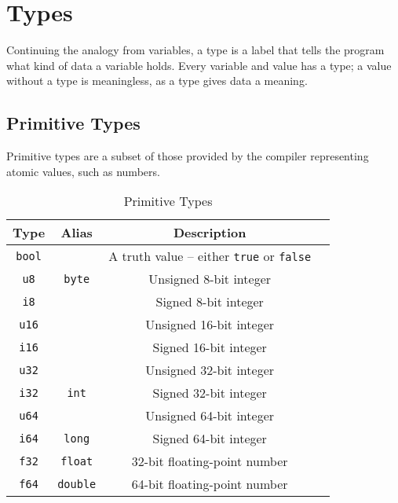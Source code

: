 \documentclass{article}
\begin{document}
    \section{Types}

    Continuing the analogy from variables, a type is a label that tells the program what kind of data a variable holds.
    Every variable and value has a type; a value without a type is meaningless, as a type gives data a meaning.

    \subsection{Primitive Types}

    Primitive types are a subset of those provided by the compiler representing atomic values, such as numbers.

    \medskip
    \begin{table}[H]
        \begin{tabular}{|c|c|c|l|}
            \hline
            \textbf{Type} & \textbf{Alias} & \textbf{Description} \\
            \hline
            \texttt{bool} & & A truth value -- either \texttt{true} or \texttt{false} \\
            \hline
            \texttt{u8} & \texttt{byte} & Unsigned 8-bit integer \\
            \texttt{i8} & & Signed 8-bit integer \\
            \hline
            \texttt{u16} & & Unsigned 16-bit integer \\
            \texttt{i16} & & Signed 16-bit integer \\
            \hline
            \texttt{u32} & & Unsigned 32-bit integer \\
            \texttt{i32} & \texttt{int} & Signed 32-bit integer \\
            \hline
            \texttt{u64} & & Unsigned 64-bit integer \\
            \texttt{i64} & \texttt{long} & Signed 64-bit integer \\
            \hline
            \texttt{f32} & \texttt{float} & 32-bit floating-point number \\
            \texttt{f64} & \texttt{double} & 64-bit floating-point number \\
            \hline
        \end{tabular}
        \caption{Primitive Types}\label{tab:primitive-types}
    \end{table}
\end{document}
